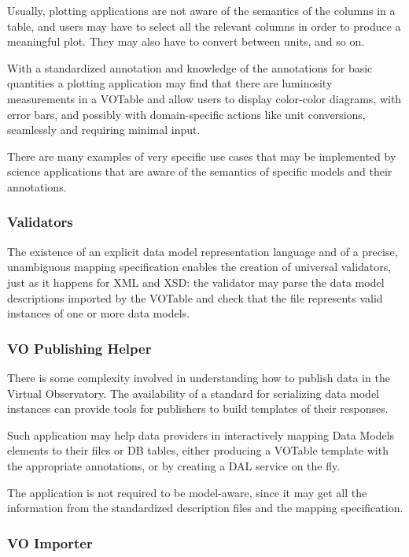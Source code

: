 \documentclass[11pt,a4paper]{ivoa}
\begin{document}
Usually, plotting applications are not aware of the semantics of the
columns in a table, and users may have to select all the relevant
columns in order to produce a meaningful plot. They may also have to
convert between units, and so on.

With a standardized annotation and knowledge of the annotations for
basic quantities a plotting application may find that there are
luminosity measurements in a VOTable and allow users to display
color-color diagrams, with error bars, and possibly with domain-specific
actions like unit conversions, seamlessly and requiring minimal input.

There are many examples of very specific use cases that may be
implemented by science applications that are aware of the semantics of
specific models and their annotations.

\subsubsection{Validators}\label{validators}

The existence of an explicit data model representation language and of a
precise, unambiguous mapping specification enables the creation of
universal validators, just as it happens for XML and XSD: the validator
may parse the data model descriptions imported by the VOTable and check
that the file represents valid instances of one or more data models.

\subsubsection{VO Publishing Helper}\label{vo-publishing-helper}

There is some complexity involved in understanding how to publish data
in the Virtual Observatory. The availability of a standard for
serializing data model instances can provide tools for publishers to
build templates of their responses.

Such application may help data providers in interactively mapping Data
Models elements to their files or DB tables, either producing a VOTable
template with the appropriate annotations, or by creating a DAL service
on the fly.

The application is not required to be model-aware, since it may get all
the information from the standardized description files and the mapping
specification.

\subsubsection{VO Importer}\label{vo-importer}
\end{document}
